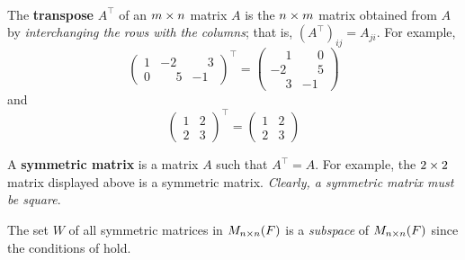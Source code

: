 \begin{additional definition} \label{adef 1.6}\ 

 The \textbf{transpose} \(A^\top\) of an \(m \times n\) matrix \(A\) is the \(n \times m\) matrix obtained from \(A\) by \emph{interchanging the rows with the columns};
that is, \((A^\top)_{ij} = A_{ji}\).
For example,
\[
\begin{pmatrix}
1 &           -2 & \phantom{-}3 \\
0 & \phantom{-}5 &           -1
\end{pmatrix}^\top =
\begin{pmatrix}
\phantom{-}1  & \phantom{-}0 \\
          -2  & \phantom{-}5 \\
\phantom{-}3  &           -1
\end{pmatrix}
\]
and
\[
\begin{pmatrix}
1 &  2 \\
2 &  3
\end{pmatrix}^\top =
\begin{pmatrix}
 1  &  2 \\
 2  &  3
\end{pmatrix}
\]

 A \textbf{symmetric matrix} is a matrix \(A\) such that \(A^\top = A\).
For example, the \(2 \times 2\) matrix displayed above is a symmetric matrix.
\emph{Clearly, a symmetric matrix must be square}.
\end{additional definition}

\begin{additional theorem} \label{athm 1.1}
The set \(W\) of all symmetric matrices in \(M_{n \times n}(F)\) is a \emph{subspace} of \(M_{n \times n}(F)\) since the conditions of  hold.
\end{additional theorem}

